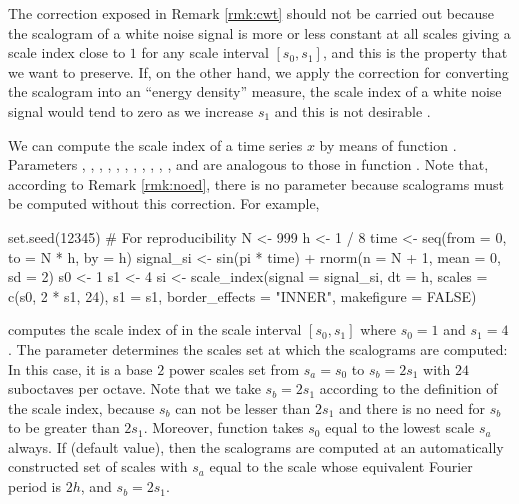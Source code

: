 \begin{rmk}
\label{rmk:noed}
The correction exposed in Remark \ref{rmk:cwt} should not be carried out because the scalogram of a white noise signal is more or less constant at all scales giving a scale index close to $1$ for any scale interval $\left[ s_0,s_1\right] $, and this is the property that we want to preserve. If, on the other hand, we apply the correction for converting the scalogram into an ``energy density'' measure, the scale index of a white noise signal would tend to zero as we increase $s_1$ and this is not desirable \citep{bol20}.
\end{rmk}

We can compute the scale index of a time series $x$ by means of function . Parameters , , , , , , , , , , ,  and  are analogous to those in function . Note that, according to Remark \ref{rmk:noed}, there is no parameter  because scalograms must be computed without this correction. For example,
\begin{example}
set.seed(12345) # For reproducibility
N <- 999
h <- 1 / 8
time <- seq(from = 0, to = N * h, by = h)
signal_si <- sin(pi * time) + rnorm(n = N + 1, mean = 0, sd = 2)
s0 <- 1
s1 <- 4
si <- scale_index(signal = signal_si, dt = h,
                  scales = c(s0, 2 * s1, 24), s1 = s1,
                  border_effects = "INNER", makefigure = FALSE)
\end{example}
computes the scale index of  in the scale interval $\left[ s_0,s_1\right] $ where $s_0=1$ and $s_1=4$. The parameter  determines the scales set at which the scalograms are computed: In this case, it is a base $2$ power scales set from $s_a=s_0$ to $s_b=2s_1$ with $24$ suboctaves per octave. Note that we take $s_b=2s_1$ according to the definition of the scale index, because $s_b$ can not be lesser than $2s_1$ and there is no need for $s_b$ to be greater than $2s_1$. Moreover, function  takes $s_0$ equal to the lowest scale $s_a$ always. If  (default value), then the scalograms are computed at an automatically constructed set of scales with $s_a$ equal to the scale whose equivalent Fourier period is $2h$, and $s_b=2s_1$.

